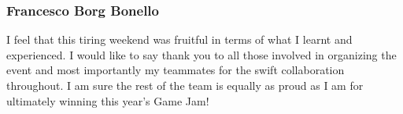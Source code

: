 \documentclass[11pt]{article}
\begin{document}
\subsubsection{Francesco Borg Bonello}
I feel that this tiring weekend was fruitful in terms of what I learnt and experienced. I would like to say thank you to all those involved in organizing the event and most importantly my teammates for the swift collaboration throughout. I am sure the rest of the team is equally as proud as I am for ultimately winning this year's Game Jam!
\end{document}
